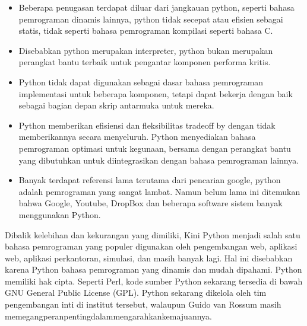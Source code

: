 	\begin{itemize}
		\item Beberapa penugasan terdapat diluar dari jangkauan python, seperti bahasa pemrograman dinamis lainnya, python tidak secepat atau eﬁsien sebagai statis, tidak seperti bahasa pemrograman kompilasi seperti bahasa C. 
		\item Disebabkan python merupakan interpreter, python bukan merupakan perangkat bantu terbaik untuk pengantar komponen performa kritis. 
		\item Python tidak dapat digunakan sebagai dasar bahasa pemrograman implementasi untuk beberapa komponen, tetapi dapat bekerja dengan baik sebagai bagian depan skrip antarmuka untuk mereka. 
		\item Python memberikan eﬁsiensi dan ﬂeksibilitas tradeoff by dengan tidak memberikannya secara menyeluruh. Python menyediakan bahasa pemrograman optimasi untuk kegunaan, bersama dengan perangkat bantu yang dibutuhkan untuk diintegrasikan dengan bahasa pemrograman lainnya.
		\item Banyak terdapat referensi lama terutama dari pencarian google, python adalah pemrograman yang sangat lambat. Namun belum lama ini ditemukan bahwa Google, Youtube, DropBox dan beberapa software sistem banyak menggunakan Python.
	\end{itemize}
Dibalik kelebihan dan kekurangan yang dimiliki, Kini Python menjadi salah satu bahasa pemrograman yang populer digunakan oleh pengembangan web, aplikasi web, aplikasi perkantoran, simulasi, dan masih banyak lagi. Hal ini disebabkan karena Python bahasa pemrograman yang dinamis dan mudah dipahami. Python memiliki hak cipta. Seperti Perl, kode sumber Python sekarang tersedia di bawah GNU General Public License (GPL). Python sekarang dikelola oleh tim pengembangan inti di institut tersebut, walaupun Guido van Rossum masih memegangperanpentingdalammengarahkankemajuannya.

